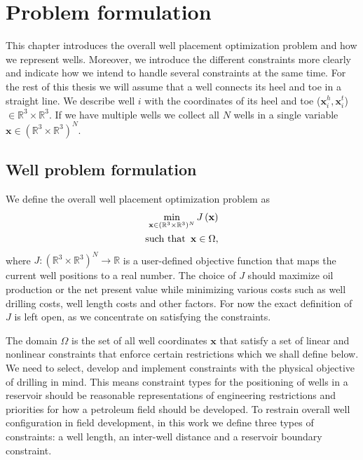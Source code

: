 %
\chapter{Problem formulation}
%
This chapter
introduces the overall well placement optimization problem
and how we represent wells. Moreover, we introduce the different 
constraints more clearly and indicate how we intend to handle 
several constraints at the same time.
%
For the rest of this thesis we will assume that a well connects
its heel and toe in a straight line.
We describe well $i$ with the coordinates of its heel and toe
($\textbf{x}_i^h, \textbf{x}_i^t$) $\in \mathbb{R}^3 \times \mathbb{R}^3$.
If we have multiple wells we collect all $N$ wells in a single variable
$\textbf{x} \in (\mathbb{R}^3 \times \mathbb{R}^3)^N$.
%
\section{Well problem formulation}
We define the overall well placement optimization problem as
%
\begin{equation}
\begin{aligned}
\min_{\textbf{x} \in (\mathbb{R}^3 \times \mathbb{R}^3)^N} J\left( \textbf{x} \right) \\
\text{such that} \hspace{5px} \textbf{x} \in \Omega,
\label{problemOmega}
\end{aligned}
\end{equation}
% 
% 
where $J: (\mathbb{R}^3 \times \mathbb{R}^3)^N \rightarrow \mathbb{R} $ is a
user-defined objective function that maps the current well positions to a real
number. The choice of $J$ should maximize oil production or the net present value
while minimizing various costs such as well drilling costs, well length costs and
other factors. For now the exact definition of $J$ is left open, as we concentrate
on satisfying the constraints.

The domain $\Omega$ is the set of all well coordinates $\textbf{x}$ that satisfy a 
set of linear and nonlinear constraints that enforce certain restrictions which we 
shall define below.
%
We need to select, develop and implement constraints with the
physical objective of drilling in mind. 
%
This means constraint types for the positioning of wells
in a reservoir should be reasonable representations of 
engineering restrictions and priorities for how a petroleum 
field should be developed.
% 
To restrain overall well configuration in field development,
in this work we define three types of constraints: a well 
length, an inter-well distance and a reservoir boundary 
constraint.
%
